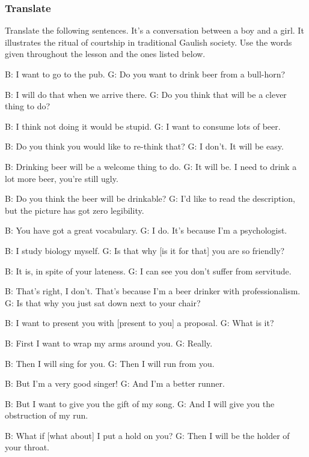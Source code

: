 \subsubsection{Translate}

Translate the following sentences. It's a conversation between a boy and a girl. It illustrates the ritual of courtship in traditional Gaulish society. Use the words given throughout the lesson and the ones listed below.


B: I want to go to the pub.
G: Do you want to drink beer from a bull-horn?

B: I will do that when we arrive there.
G: Do you think that will be a clever thing to do?

B: I think not doing it would be stupid.
G: I want to consume lots of beer.

B: Do you think you would like to re-think that?
G: I don't. It will be easy.

B: Drinking beer will be a welcome thing to do.
G: It will be. I need to drink a lot more beer, you're still ugly.

B: Do you think the beer will be drinkable?
G: I'd like to read the description, but the picture has got zero legibility.

B: You have got a great vocabulary.
G: I do. It's because I'm a psychologist.

B: I study biology myself.
G: Is that why [is it for that] you are so friendly?

B: It is, in spite of your lateness.
G: I can see you don't suffer from servitude.

B: That's right, I don't. That's because I'm a beer drinker with professionalism.
G: Is that why you just sat down next to your chair?

B: I want to present you with [present to you] a proposal.
G: What is it?

B: First I want to wrap my arms around you.
G: Really.

B: Then I will sing for you.
G: Then I will run from you.

B: But I'm a very good singer!
G: And I'm a better runner.

B: But I want to give you the gift of my song.
G: And I will give you the obstruction of my run.

B: What if [what about] I put a hold on you?
G: Then I will be the holder of your throat.

